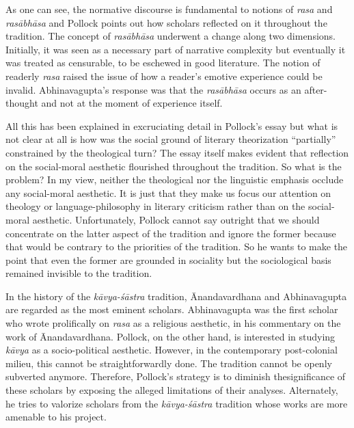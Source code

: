 As one can see, the normative discourse is fundamental to notions of \textsl{rasa} and \textsl{rasābhāsa} and Pollock points out how scholars reflected on it throughout the tradition. The concept of \textsl{rasābhāsa} underwent a change along two dimensions. Initially, it was seen as a necessary part of narrative complexity but eventually it was treated as censurable, to be eschewed in good literature. The notion of readerly \textsl{rasa} raised the issue of how a reader's emotive experience could be invalid. Abhinavagupta's response was that the \textsl{rasābhāsa} occurs as an after-thought and not at the moment of experience itself.

All this has been explained in excruciating detail in Pollock's essay but what is not clear at all is how was the social ground of literary theorization ``partially'' constrained by the theological turn? The essay itself makes evident that reflection on the social-moral aesthetic flourished throughout the tradition. So what is the problem? In my view, neither the theological nor the linguistic emphasis occlude any social-moral aesthetic. It is just that they make us focus our attention on theology or language-philosophy in literary criticism rather than on the social-moral aesthetic. Unfortunately, Pollock cannot say outright that we should concentrate on the latter aspect of the tradition and ignore the former because that would be contrary to the priorities of the tradition. So he wants to make the point that even the former are grounded in sociality but the sociological basis remained invisible to the tradition.

In the history of the \textsl{kāvya-śāstra} tradition, Ānandavardhana and Abhinavagupta are regarded as the most eminent scholars. Abhinavagupta was the first scholar who wrote prolifically on \textsl{rasa} as a religious aesthetic, in his commentary on the work of Ānandavardhana. Pollock, on the other hand, is interested in studying \textsl{kāvya} as a socio-political aesthetic. However, in the contemporary post-colonial milieu, this cannot be straightforwardly done. The tradition cannot be openly subverted anymore. Therefore, Pollock's strategy is to diminish the\break significance of these scholars by exposing the alleged limitations of their analyses. Alternately, he tries to valorize scholars from the \textsl{kāvya-śāstra} tradition whose works are more amenable to his project.

